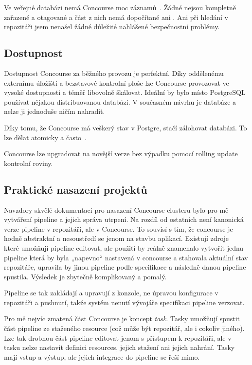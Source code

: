         Ve veřejné databázi  nemá Concourse moc záznamů~\cite{cve-concourse}. Žádné nejsou kompletně zařazené a otagované a část z nich nemá dopočítané ani . Ani při hledání v repozitáři jsem nenašel žádné důležité nahlášené bezpečnostní problémy.

    \subsection{Dostupnost}
        Dostupnost Concourse za běžného provozu je perfektní. Díky oddělenému externímu úložišti a bezstavové kontrolní ploše lze Concourse provozovat ve vysoké dostupnosti a téměř libovolně škálovat. Ideální by bylo místo PostgreSQL používat nějakou distribuovanou  databázi. V současném návrhu je databáze  a nelze ji jednoduše ničím nahradit.

        Díky tomu, že Concourse má veškerý stav v Postgre, stačí zálohovat databázi. To lze dělat atomicky a často~\cite{pg-backup}.

        Concourse lze upgradovat na novější verze bez výpadku pomocí rolling update kontrolní roviny.

    \subsection{Praktické nasazení projektů}
        Navzdory skvělé dokumentaci pro nasazení Concourse clusteru bylo pro mě vytváření pipeline a jejich správa utrpení. Na rozdíl od ostatních \CI není kanonická verze pipeline v repozitáři, ale v Concourse. To souvisí s tím, že concourse je hodně abstraktní a nesoustředí se jenom na stavbu aplikací. Existují zdroje~\cite{concourse-pipeline-res} které umožňují pipeline editovat, ale použití by reálně znamenalo vytvořit jednu pipeline která by byla „napevno“ nastavená v concourse a stahovala aktuální stav repozitáře, upravila by jinou pipeline podle specifikace a následně danou pipeline spustila. Výsledek je zbytečně komplikovaný a pomalý.

        Pipeline se tak zakládají a upravují z konzole, ne úpravou konfigurace v repozitáři a pushnutí, takže systém nenutí vývojáře specifikaci pipeline verzovat.

        Pro mě nejvíc zmatená část Concourse je koncept \textit{task}. Tasky umožňují spustit část pipeline ze staženého resource (což může být repozitář, ale i cokoliv jiného). Lze tak drobnou část pipeline editovat jenom s přístupem k repozitáři, ale v tasku nelze nastavit definici resources, jejich stažení ani jejich nahrání. Tasky mají vstup a výstup, ale jejich integrace do pipeline se řeší mimo.

